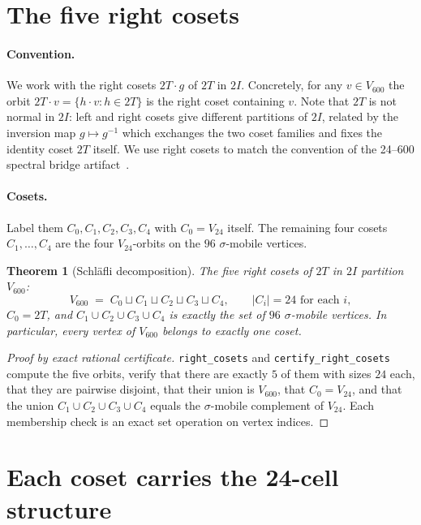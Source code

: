 \documentclass[11pt]{article}
\newcommand{\Vsix}{V_{600}}
\newcommand{\Vtwentyfour}{V_{24}}
\newcommand{\twoI}{2I}
\newcommand{\twoT}{2T}
\theoremstyle{plain}
\newtheorem{theorem}{Theorem}
\theoremstyle{definition}
\begin{document}
\section{The five right cosets}\label{sec:cosets}

\paragraph{Convention.}
We work with the right cosets $\twoT\!\cdot\! g$ of $\twoT$ in
$\twoI$.  Concretely, for any $v\in\Vsix$ the orbit $\twoT\!\cdot\! v
= \{h\cdot v : h\in\twoT\}$ is the right coset containing $v$.  Note
that $\twoT$ is not normal in $\twoI$: left and right cosets give
different partitions of $\twoI$, related by the inversion map
$g\mapsto g^{-1}$ which exchanges the two coset families and fixes
the identity coset $\twoT$ itself.  We use right cosets to match the
convention of the 24--600 spectral bridge
artifact~\cite{Smart24600Bridge}.

\paragraph{Cosets.}
Label them $C_0, C_1, C_2, C_3, C_4$ with $C_0 = \Vtwentyfour$ itself.
The remaining four cosets $C_1, \dots, C_4$ are the four
$\Vtwentyfour$-orbits on the $96$ $\sigma$-mobile vertices.

\begin{theorem}[Schl\"afli decomposition]\label{thm:schlafli}
The five right cosets of $\twoT$ in $\twoI$ partition $\Vsix$:
\[
  \Vsix \;=\; C_0 \sqcup C_1 \sqcup C_2 \sqcup C_3 \sqcup C_4,
  \qquad |C_i| = 24 \text{ for each } i,
\]
$C_0 = \twoT$, and $C_1 \cup C_2 \cup C_3 \cup C_4$ is exactly the
set of $96$ $\sigma$-mobile vertices.  In particular, every vertex
of $\Vsix$ belongs to exactly one coset.
\end{theorem}

\begin{proof}[Proof by exact rational certificate]
\texttt{right\_cosets} and \texttt{certify\_right\_cosets} compute
the five orbits, verify that there are exactly $5$ of them with
sizes $24$ each, that they are pairwise disjoint, that their union
is $\Vsix$, that $C_0 = \Vtwentyfour$, and that the union
$C_1\cup C_2\cup C_3\cup C_4$ equals the $\sigma$-mobile complement
of $\Vtwentyfour$.  Each membership check is an exact set operation
on vertex indices.
\end{proof}

\section{Each coset carries the 24-cell structure}\label{sec:24cell}
\end{document}
